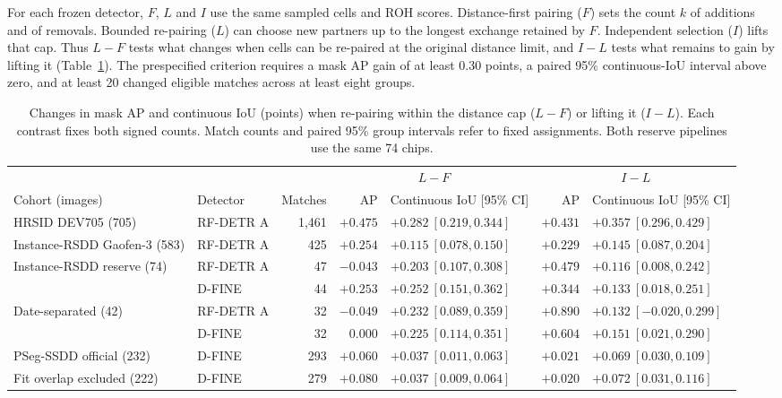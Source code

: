 \documentclass[journal]{IEEEtran}
\begin{document}
For each frozen detector, \(F\), \(L\) and \(I\) use the same sampled cells and ROH scores. Distance-first pairing (\(F\)) sets the count \(k\) of additions and of removals. Bounded re-pairing (\(L\)) can choose new partners up to the longest exchange retained by \(F\). Independent selection (\(I\)) lifts that cap. Thus \(L-F\) tests what changes when cells can be re-paired at the original distance limit, and \(I-L\) tests what remains to gain by lifting it (Table~\ref{tab:bounded-results}). The prespecified criterion requires a mask AP gain of at least 0.30 points, a paired 95\% continuous-IoU interval above zero, and at least 20 changed eligible matches across at least eight groups.

\begin{table}[t]
\centering
\caption{Changes in mask AP and continuous IoU (points) when re-pairing within the distance cap (\(L-F\)) or lifting it (\(I-L\)). Each contrast fixes both signed counts. Match counts and paired 95\% group intervals refer to fixed assignments. Both reserve pipelines use the same 74 chips.}
\label{tab:bounded-results}
\footnotesize
\setlength{\tabcolsep}{4pt}
\renewcommand{\arraystretch}{1.08}
\begin{tabular}{@{}llr r l r l@{}}
\toprule
& & & \multicolumn{2}{c}{\(L-F\)} & \multicolumn{2}{c}{\(I-L\)}\\
\cmidrule(lr){4-5}\cmidrule(l){6-7}
Cohort (images) & Detector & Matches & AP & Continuous IoU [95\% CI] & AP & Continuous IoU [95\% CI]\\
\midrule
HRSID DEV705 (705) & RF-DETR A & 1,461 & \(+0.475\) & \(+0.282\ [0.219,0.344]\) & \(+0.431\) & \(+0.357\ [0.296,0.429]\)\\
Instance-RSDD Gaofen-3 (583) & RF-DETR A & 425 & \(+0.254\) & \(+0.115\ [0.078,0.150]\) & \(+0.229\) & \(+0.145\ [0.087,0.204]\)\\
Instance-RSDD reserve (74) & RF-DETR A & 47 & \(-0.043\) & \(+0.203\ [0.107,0.308]\) & \(+0.479\) & \(+0.116\ [0.008,0.242]\)\\
 & D-FINE & 44 & \(+0.253\) & \(+0.252\ [0.151,0.362]\) & \(+0.344\) & \(+0.133\ [0.018,0.251]\)\\
\quad Date-separated (42) & RF-DETR A & 32 & \(-0.049\) & \(+0.232\ [0.089,0.359]\) & \(+0.890\) & \(+0.132\ [-0.020,0.299]\)\\
 & D-FINE & 32 & \(0.000\) & \(+0.225\ [0.114,0.351]\) & \(+0.604\) & \(+0.151\ [0.021,0.290]\)\\
PSeg-SSDD official (232) & D-FINE & 293 & \(+0.060\) & \(+0.037\ [0.011,0.063]\) & \(+0.021\) & \(+0.069\ [0.030,0.109]\)\\
\quad Fit overlap excluded (222) & D-FINE & 279 & \(+0.080\) & \(+0.037\ [0.009,0.064]\) & \(+0.020\) & \(+0.072\ [0.031,0.116]\)\\
\bottomrule
\end{tabular}
\end{table}
\end{document}
